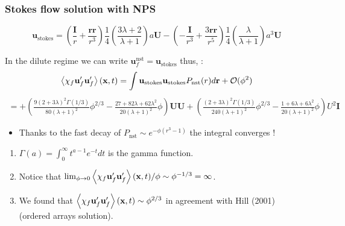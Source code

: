 \documentclass{sintefbeamer}
\begin{document}
\begin{frame}
  \frametitle{Stokes flow solution with NPS}
  \begin{small}
    \begin{equation*}
      \textbf{u}_\text{stokes} 
      = \left(\frac{ \textbf{I}}{r} + \frac{\textbf{rr}}{r^3}\right)  \frac{1}{4}\left(\frac{3\lambda + 2}{\lambda +1}\right) a \textbf{U}
      - \left(-\frac{\textbf{I}}{r^3} + \frac{3 \textbf{rr} }{r^5}\right)  \frac{1}{4}\left(\frac{\lambda}{\lambda +1}\right) a^3 \textbf{U}
    \end{equation*}
  \end{small}
  In the dilute regime we can write $\textbf{u}_f^\text{nst} = \textbf{u}_\text{stokes}$ thus,  :
  \begin{equation*}
    \left<\chi_f \textbf{u}'_f\textbf{u}'_f\right>(\textbf{x},t)
    = 
    {\int \textbf{u}_\text{stokes} \textbf{u}_\text{stokes}  
    P_\text{nst}(r) d\textbf{r} }
    + \mathcal{O}(\phi^2)
  \end{equation*}\pause
  \footnotesize
  \begin{multline*}
    =  
    + \left(\frac{9(2+3\lambda)^2 \Gamma(1/3)}{80 (\lambda +1)^2}\phi^{2/3} 
    - \frac{27+82\lambda + 62\lambda^2}{20(\lambda + 1)^2}\phi \right)\textbf{UU}
    + \left(\frac{(2+3\lambda)^2 \Gamma(1/3)}{240 (\lambda +1)^2}\phi^{2/3} 
     - \frac{1+6\lambda + 6\lambda^2}{20(\lambda + 1)^2}\phi \right)U^2\textbf{I} 
  \end{multline*}

  \begin{itemize}
    \item Thanks to the fast decay of $P_\text{nst} \sim e^{-\phi (r^3-1)}$ the integral converges ! 
  \end{itemize}
  \begin{enumerate}
    \item $\Gamma(a) = \int_0^\infty t^{a-1} e^{-t} dt $ is the gamma  function. 
    \item  Notice that $\lim_{\phi \to 0} \left<\chi_f \textbf{u}'_f\textbf{u}'_f\right>(\textbf{x},t)/\phi \sim\phi^{-1/3} =\infty$. 
    \item We found that $\left<\chi_f \textbf{u}'_f\textbf{u}'_f\right>(\textbf{x},t)\sim\phi^{2/3}$ in agreement with Hill (2001) (ordered arrays solution). 
  \end{enumerate}
    
\end{frame}
\end{document}
